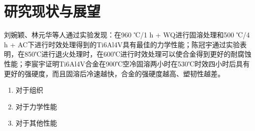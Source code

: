 \documentclass[
class = book,
zihao = -4,
font = noto,
paper = a4paper,
openany
]{easybook}
\newcommand{\ti}{Ti6Al4V}
\begin{document}
\section{研究现状与展望}
 刘婉颖、林元华等人通过实验发现：在960 ℃/1 h + WQ进行固溶处理和500 ℃/4 h + AC下进行时效处理得到的\ti 具有最佳的力学性能\cite{960500}；陈冠宇通过实验表明，在850℃进行退火处理时，在600℃进行时效处理可以使合金得到更好的耐腐蚀性能\cite{1200}；李宸宇证明\ti 合金在900℃空冷固溶两小时在530℃时效四小时后具有更好的强硬度，而且固溶后冷速越快，合金的强硬度越高、塑韧性越差\cite{900}。%


	\begin{enumerate}
		\item 对于组织
		\item 对于力学性能
		\item 对于其他性能
	\end{enumerate}


	\backmatter
	\listoffigures
	\listoftables
	\clearpage
	
\end{document}
